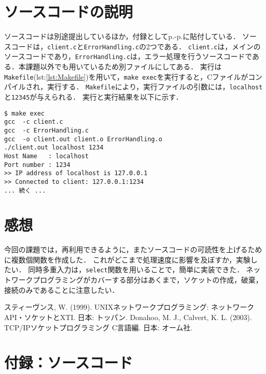 \documentclass[12pt]{jlreq}
\begin{document}
\section*{ソースコードの説明}
ソースコードは別途提出しているほか，付録としてp.\pageref{apendix}-p.\pageref{LastPage}に貼付している．
ソースコードは，\texttt{client.c}と\texttt{ErrorHandling.c}の2つである．
\texttt{client.c}は，メインのソースコードであり，\texttt{ErrorHandling.c}は，エラー処理を行うソースコードである．本課題以外でも用いているため別ファイルにしてある．
実行は\texttt{Makefile}(lst:\ref{lst:Makefile})を用いて，\texttt{make exec}を実行すると，Cファイルがコンパイルされ，実行する．
\texttt{Makefile}により，実行ファイルの引数には，\texttt{localhost}と\texttt{12345}が与えられる．
実行と実行結果を以下に示す．
\begin{lstlisting}[]
$ make exec
gcc  -c client.c
gcc  -c ErrorHandling.c
gcc  -o client.out client.o ErrorHandling.o
./client.out localhost 1234
Host Name   : localhost
Port number : 1234
>> IP address of localhost is 127.0.0.1
>> Connected to client: 127.0.0.1:1234
... 続く ...
\end{lstlisting}


\section*{感想}
今回の課題では，再利用できるように，またソースコードの可読性を上げるために複数個関数を作成した．
これがどこまで処理速度に影響を及ぼすか，実験したい．
同時多重入力は，\texttt{select}関数を用いることで，簡単に実装できた．
ネットワークプログラミングがカバーする部分はあくまで，ソケットの作成，破棄，接続のみであることに注意したい．

\renewcommand{\refname}{参考}
\begin{thebibliography}{2}
    スティーヴンス, W. (1999).
    UNIXネットワークプログラミング: ネットワークAPI・ソケットとXTI. 日本: トッパン.
    Donahoo, M. J., Calvert, K. L. (2003).
    TCP/IPソケットプログラミング C言語編. 日本: オーム社.
\end{thebibliography}
\newpage
\section*{付録：ソースコード}
\label{apendix}



\end{document}
